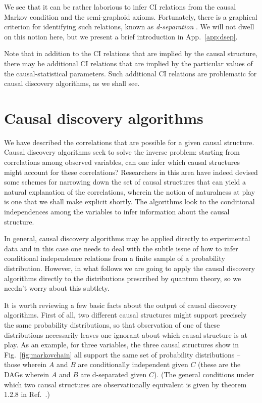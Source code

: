 \documentclass[12pt,onecolumn,nofootinbib]{revtex4-2}
\begin{document}
We see that it can be rather laborious to infer CI relations from the causal Markov condition and the semi-graphoid axioms.  Fortunately, there is a graphical criterion for identifying such relations, known as \emph{d-separation} \cite{Pearl2009}. We will not dwell on this notion here, but we present a brief introduction in App.~\ref{app:dsep}.


Note that in addition to the CI relations that are implied by the causal structure, there may be additional CI relations that are implied by the particular values of the causal-statistical parameters.   Such additional CI relations are problematic for causal discovery algorithms, as we shall see.

\section{Causal discovery algorithms}
\label{sec:causalalg}

We have described the correlations that are possible
for a given causal structure.  Causal discovery algorithms seek to solve
the inverse problem: starting from correlations among observed variables,
can one infer which causal structures might account for these correlations?
Researchers in this area have indeed devised some schemes for narrowing down
the set of causal structures that can yield a natural explanation of the
correlations, wherein the notion of naturalness at play is one that we shall
make explicit shortly.  The algorithms look to the conditional
independences among the variables to infer information about the causal structure.



In general, causal discovery algorithms may be applied directly to experimental data and in this case one needs to deal with the subtle issue of how to infer conditional independence relations from a finite sample of a probability distribution.  However, in what follows we are going to apply the causal discovery algorithms directly to the distributions prescribed by quantum theory, so we needn't worry about this subtlety.

It is worth reviewing a few basic facts about the output of causal discovery algorithms. First of all, two different causal structures might support precisely the same probability distributions, so that observation of
one of these distributions necessarily leaves one ignorant about which
causal structure is at play. As an example, for three variables, the three
causal structures show in Fig.~\ref{fig:markovchain} all support the same set of probability distributions -- those wherein $A$ and $B$ are conditionally independent given $C$ (these are the DAGs wherein $A$ and $B$ are d-separated given $C$). (The general conditions under which two causal structures are observationally equivalent is given by theorem 1.2.8 in Ref.~\cite{Pearl2009}.)
\end{document}

